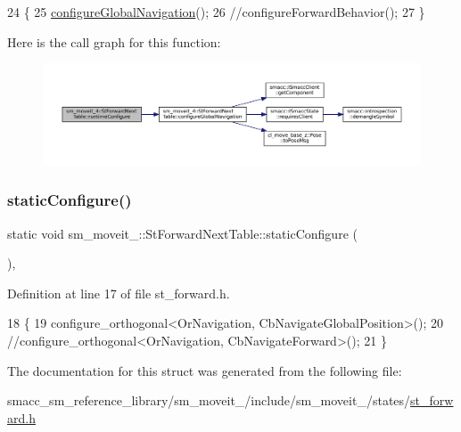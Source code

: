 \begin{DoxyCode}
24   \{
25     \hyperlink{structsm__moveit__4_1_1StForwardNextTable_abda625487098c60f3d0507092aba19ce}{configureGlobalNavigation}();
26     \textcolor{comment}{//configureForwardBehavior();}
27   \}
\end{DoxyCode}
Here is the call graph for this function\+:
\nopagebreak
\begin{figure}[H]
\begin{center}
\leavevmode
\includegraphics[width=350pt]{structsm__moveit__4_1_1StForwardNextTable_a344aca6962b546a618d94aeb109f3944_cgraph}
\end{center}
\end{figure}
\mbox{\label{structsm__moveit__4_1_1StForwardNextTable_a05f8c64fcf77588d6e73324b47b8022f}} 
\subsubsection{\texorpdfstring{static\+Configure()}{staticConfigure()}}
{\footnotesize\ttfamily static void sm\+\_\+moveit\+\_\+::\+St\+Forward\+Next\+Table\+::static\+Configure (\begin{DoxyParamCaption}{ }\end{DoxyParamCaption})\hspace{0.3cm}{\ttfamily [inline]}, {\ttfamily [static]}}



Definition at line 17 of file st\+\_\+forward.\+h.


\begin{DoxyCode}
18   \{
19      configure\_orthogonal<OrNavigation, CbNavigateGlobalPosition>();
20     \textcolor{comment}{//configure\_orthogonal<OrNavigation, CbNavigateForward>();}
21   \}
\end{DoxyCode}


The documentation for this struct was generated from the following file\+:\begin{DoxyCompactItemize}
\item 
smacc\+\_\+sm\+\_\+reference\+\_\+library/sm\+\_\+moveit\+\_/include/sm\+\_\+moveit\+\_/states/\hyperlink{4_2include_2sm__moveit__4_2states_2st__forward_8h}{st\+\_\+forward.\+h}\end{DoxyCompactItemize}
